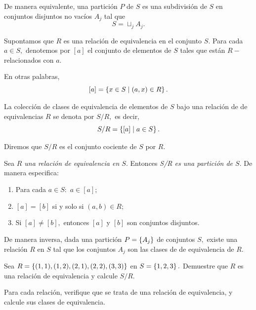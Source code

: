	
	De manera equivalente, una partici\'on $P$ de $S$ es una subdivisi\'on de $S$ en conjuntos disjuntos no vac\'ios $A_{j}$ tal que $$S= \sqcup_{j} A_{j}.$$



	Supontamos que $R$ es una relaci\'on de equivalencia en el conjunto $S.$ Para cada $a\in S,$ denotemos por $[a]$ el conjunto de elementos de $S$ tales que est\'an $R-$relacionados con $a.$ 
	
	
	En otras palabras,
	$$
	[a]=\left\{ x \in S \mid (a,x)\in R \right\}.
	$$



	La colecci\'on de clases de equivalencia de elementos de $S$ bajo una relaci\'on de de equivalencias $R$ se denota por $S/R,$ es decir,
	$$
	S/R=\left\{ [a] \mid a \in S \right\}.
	$$
	 
	
	Diremos que $S/R$ es el conjunto cociente de $S$ por $R.$



	\begin{thm}
		\label{lip:thm:2.6}
		Sea \emph{$R$ una relaci\'on de equivalencia en $S.$} Entonces \emph{S/R es una partici\'on de $S.$} 
		De manera especifica:
		\begin{enumerate}
			\item Para cada $a \in S:$  $a\in [a];$
			\item $[a]=[b]$ si y solo si $(a,b)\in R;$
			\item Si $[a]\neq [b],$ entonces $[a]$ y $[b]$ son conjuntos disjuntos. 
		\end{enumerate}
		
		
		De manera inversa, dada una partici\'on $P=\left\{ A_{j} \right\}$ de conjuntos $S,$ existe una relaci\'on $R$ en $S$ tal que los conjuntos $A_{j}$ son las clases de de equivalencia de $R.$
	\end{thm}
	



	\begin{exmp}
		\label{lip:exmp:2.13.b}
		Sea $R=\left\{ (1,1),(1,2),(2,1),(2,2),(3,3) \right\}$ en $S=\left\{ 1,2,3 \right\}.$ Demuestre que $R$ es una relaci\'on de equivalencia y calcule $S/R.$
	\end{exmp}
	



	\begin{exmp}
		Para cada relaci\'on, verifique que se trata de una relaci\'on de equivalencia, y calcule sus clases de equivalencia.
	\end{exmp}
	
